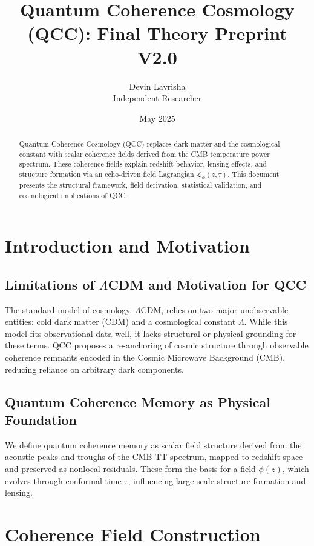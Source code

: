 \documentclass[12pt]{article}
\title{Quantum Coherence Cosmology (QCC): Final Theory Preprint V2.0}
\author{Devin Lavrisha \\ \small Independent Researcher}
\date{May 2025}
\begin{document}
\maketitle

\begin{abstract}
Quantum Coherence Cosmology (QCC) replaces dark matter and the cosmological constant with scalar coherence fields derived from the CMB temperature power spectrum. These coherence fields explain redshift behavior, lensing effects, and structure formation via an echo-driven field Lagrangian \( \mathcal{L}_\phi(z, \tau) \). This document presents the structural framework, field derivation, statistical validation, and cosmological implications of QCC.
\end{abstract}

\section{Introduction and Motivation}
\subsection{Limitations of \( \Lambda \)CDM and Motivation for QCC}
The standard model of cosmology, \( \Lambda \)CDM, relies on two major unobservable entities: cold dark matter (CDM) and a cosmological constant \( \Lambda \). While this model fits observational data well, it lacks structural or physical grounding for these terms. QCC proposes a re-anchoring of cosmic structure through observable coherence remnants encoded in the Cosmic Microwave Background (CMB), reducing reliance on arbitrary dark components.

\subsection{Quantum Coherence Memory as Physical Foundation}
We define quantum coherence memory as scalar field structure derived from the acoustic peaks and troughs of the CMB TT spectrum, mapped to redshift space and preserved as nonlocal residuals. These form the basis for a field \( \phi(z) \), which evolves through conformal time \( \tau \), influencing large-scale structure formation and lensing.

\section{Coherence Field Construction}
\end{document}
